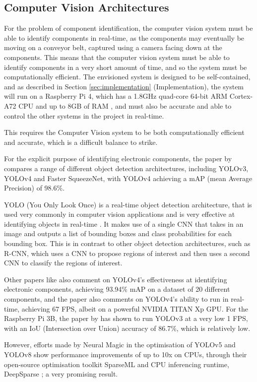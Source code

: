 \subsection{Computer Vision Architectures}
For the problem of component identification, the computer vision system must be able to identify components in real-time, as the components may eventually be moving on a conveyor belt, captured using
a camera facing down at the components. This means that the computer vision system must be able to identify components in a very short amount of time, and so the system must be computationally efficient.
The envisioned system is designed to be self-contained, and as described in Section \ref{sec:implementation} (Implementation), the system will run on a Raspberry Pi 4, which has a 1.8GHz quad-core 64-bit ARM Cortex-A72 CPU and up to 8GB of RAM \cite{pi4},
and must also be accurate and able to control the other systems in the project in real-time.

This requires the Computer Vision system to be both computationally efficient and accurate, which is a difficult balance to strike.

For the explicit purpose of identifying electronic components, the paper by \citet{s22239079} compares a range of different object detection architectures, including YOLOv3, YOLOv4 and Faster SqueezeNet, with YOLOv4 achieving a mAP (mean Average Precision) of 98.6\%.

YOLO (You Only Look Once) is a real-time object detection architecture, that is used very commonly in computer vision applications and is very effective at identifying objects in real-time \citet{yolo}. It makes
use of a single CNN that takes in an image and outputs a list of bounding boxes and class probabilities for each bounding box. This is in contrast to other object detection architectures, such as R-CNN, which uses a CNN to propose regions of interest and then uses a second CNN to classify the regions of interest.

Other papers like \citet{Guo2021} also comment on YOLOv4's effectiveness at identifying electronic components, achieving 93.94\% mAP on a dataset of 20 different components, and the paper also comments
on YOLOv4's ability to run in real-time, achieving 67 FPS, albeit on a powerful NVIDIA TITAN Xp GPU. For the Raspberry Pi 3B, the paper by \citet{9166199} has shown to run YOLOv3 at a very low 1 FPS,
with an IoU (Intersection over Union) accuracy of 86.7\%, which is relatively low.

However, efforts made by Neural Magic \cite{neuralmagic} in the optimisation of YOLOv5 and YOLOv8 show performance improvements of up to 10x on CPUs, through their open-source 
optimisation toolkit SparseML \cite{sparseml} and CPU inferencing runtime, DeepSparse \cite{deepsparse}; a very promising result.

